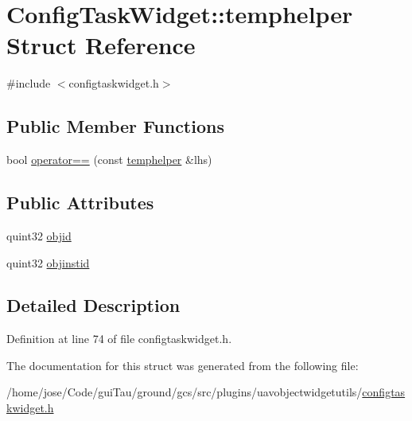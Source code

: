 \hypertarget{struct_config_task_widget_1_1temphelper}{\section{Config\-Task\-Widget\-:\-:temphelper Struct Reference}
\label{struct_config_task_widget_1_1temphelper}
}


{\ttfamily \#include $<$configtaskwidget.\-h$>$}

\subsection*{Public Member Functions}
\begin{DoxyCompactItemize}
\item 
bool \hyperlink{group___u_a_v_object_widget_utils_gaf38e83f721ec231506c2aa0bd3268280}{operator==} (const \hyperlink{struct_config_task_widget_1_1temphelper}{temphelper} \&lhs)
\end{DoxyCompactItemize}
\subsection*{Public Attributes}
\begin{DoxyCompactItemize}
\item 
quint32 \hyperlink{group___u_a_v_object_widget_utils_ga4c750b1bce138cf6e002f73fca580c4d}{objid}
\item 
quint32 \hyperlink{group___u_a_v_object_widget_utils_ga80a5419befd7432330b2ffb95368f4ed}{objinstid}
\end{DoxyCompactItemize}


\subsection{Detailed Description}


Definition at line 74 of file configtaskwidget.\-h.



The documentation for this struct was generated from the following file\-:\begin{DoxyCompactItemize}
\item 
/home/jose/\-Code/gui\-Tau/ground/gcs/src/plugins/uavobjectwidgetutils/\hyperlink{configtaskwidget_8h}{configtaskwidget.\-h}\end{DoxyCompactItemize}
